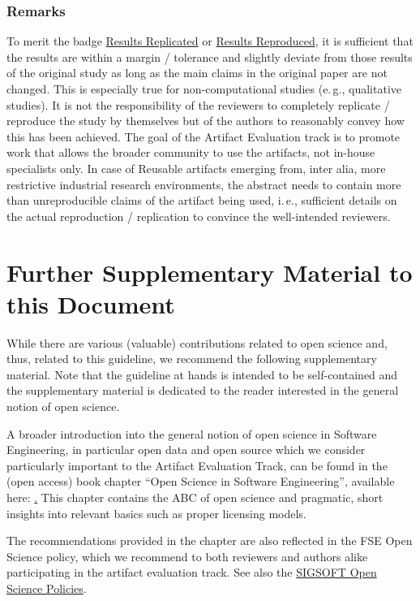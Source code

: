 \documentclass[twoside,a4paper]{refart}
\newcommand{\ie}{i.\,e.,\xspace}
\newcommand{\eg}{e.\,g.,\xspace}
\newcommand{\reproduced}{\protect\hyperlink{reproduced}{Results Reproduced}\xspace}
\newcommand{\replicated}{\protect\hyperlink{replicated}{Results Replicated}\xspace}
\begin{document}
\subsubsection{Remarks}

To merit the badge \replicated or \reproduced, it is sufficient that
the results are within a margin / tolerance and slightly deviate from
those results of the original study as long as the main claims in the
original paper are not changed. This is especially true for
non-computational studies (\eg qualitative studies). It is not the
responsibility of the reviewers to completely replicate / reproduce
the study by themselves but of the authors to reasonably convey how
this has been achieved. The goal of the Artifact Evaluation track is
to promote work that allows the broader community to use the
artifacts, not in-house specialists only. In case of Reusable
artifacts emerging from, inter alia, more restrictive industrial
research environments, the abstract needs to contain more than
unreproducible claims of the artifact being used, \ie sufficient
details on the actual reproduction / replication to convince the
well-intended reviewers.


\section{Further Supplementary Material to this Document}

While there are various (valuable) contributions related to open
science and, thus, related to this guideline, we recommend the
following supplementary material. Note that the guideline at hands is
intended to be self-contained and the supplementary material is
dedicated to the reader interested in the general notion of open
science.

A broader introduction into the general notion of open science in
Software Engineering, in particular open data and open source which we
consider particularly important to the Artifact Evaluation Track, can
be found in the (open access) book chapter ``Open Science in Software
Engineering'', available here: \href{https://doi.org/fjx4}. This
chapter contains the ABC of open science and pragmatic, short insights
into relevant basics such as proper licensing models.

The recommendations provided in the chapter are also reflected in the
FSE Open Science policy, which we recommend to both reviewers and
authors alike participating in the artifact evaluation track. See also
the \href{https://github.com/acmsigsoft/open-science-policies}{SIGSOFT
  Open Science Policies}.
\end{document}
